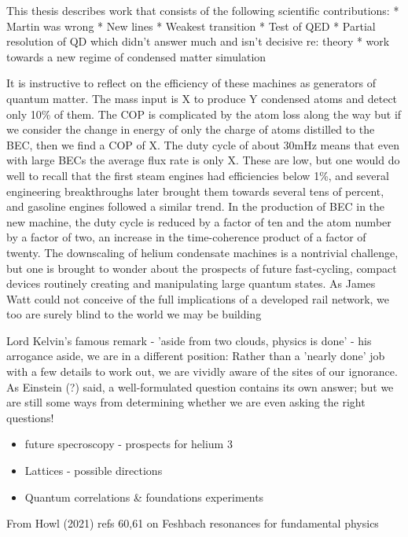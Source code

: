 This thesis describes work that consists of the following scientific
contributions: * Martin was wrong * New lines * Weakest transition *
Test of QED * Partial resolution of QD which didn't answer much and
isn't decisive re: theory * work towards a new regime of condensed
matter simulation

It is instructive to reflect on the efficiency of these machines as generators of quantum matter.
	The mass input is X to produce Y condensed atoms and detect only 10\% of them.
	The COP is complicated by the atom loss along the way but if we consider the change in energy of only the charge of atoms distilled to the BEC, then we find a COP of X.
	The duty cycle of about 30mHz means that even with large BECs the average flux rate is only X.
	These are low, but one would do well to recall that the first steam engines had efficiencies below 1\%, and several engineering breakthroughs later brought them towards several tens of percent, and gasoline engines followed a similar trend.
	In the production of BEC in the new machine, the duty cycle is reduced by a factor of ten and the atom number by a factor of two, an increase in the time-coherence product of a factor of twenty.
	The downscaling of helium condensate machines is a nontrivial challenge, but one is brought to wonder about the prospects of future fast-cycling, compact devices routinely creating and manipulating large quantum states.
	As James Watt could not conceive of the full implications of a developed rail network, we too are surely blind to the world we may be building


Lord Kelvin's famous remark - 'aside from two clouds, physics is done' - his arrogance aside, we are in a different position: Rather than a 'nearly done' job with a few details to work out, we are vividly aware of the sites of our ignorance.
	As Einstein (?) said, a well-formulated question contains its own answer; but we are still some ways from determining whether we are even asking the right questions!

\begin{itemize}
\item
  future specroscopy - prospects for helium 3
\item
  Lattices - possible directions
\item
  Quantum correlations \& foundations experiments
\end{itemize}

From Howl (2021) refs 60,61 on Feshbach resonances for fundamental physics

